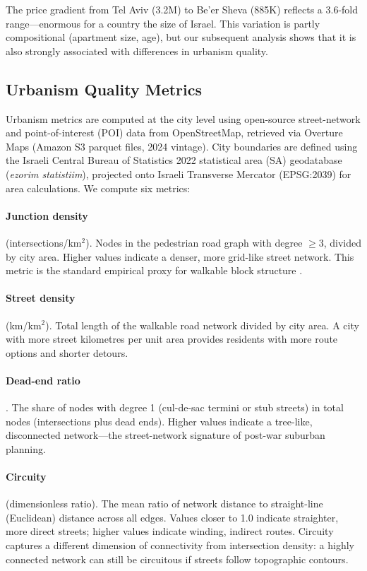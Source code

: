 \documentclass[12pt,a4paper]{article}
\begin{document}
The price gradient from Tel Aviv (\textsterling 3.2M) to Be'er Sheva
(\textsterling 885K) reflects a 3.6-fold range—enormous for a country the size
of Israel.  This variation is partly compositional (apartment size, age), but
our subsequent analysis shows that it is also strongly associated with
differences in urbanism quality.

\subsection{Urbanism Quality Metrics}
\label{sec:data_urbanism}

Urbanism metrics are computed at the city level using open-source street-network
and point-of-interest (POI) data from OpenStreetMap, retrieved via Overture Maps
(Amazon S3 parquet files, 2024 vintage).  City boundaries are defined using the
Israeli Central Bureau of Statistics 2022 statistical area (SA) geodatabase
(\textit{ezorim statistiim}), projected onto Israeli Transverse Mercator
(EPSG:2039) for area calculations.  We compute six metrics:

\paragraph{Junction density} (intersections/km$^2$).  Nodes in the pedestrian
road graph with degree $\geq 3$, divided by city area.  Higher values indicate
a denser, more grid-like street network.  This metric is the standard empirical
proxy for walkable block structure \citep{barrington2015}.

\paragraph{Street density} (km/km$^2$).  Total length of the walkable road
network divided by city area.  A city with more street kilometres per unit area
provides residents with more route options and shorter detours.

\paragraph{Dead-end ratio}.  The share of nodes with degree 1 (cul-de-sac
termini or stub streets) in total nodes (intersections plus dead ends).  Higher
values indicate a tree-like, disconnected network—the street-network signature
of post-war suburban planning.

\paragraph{Circuity} (dimensionless ratio).  The mean ratio of network distance
to straight-line (Euclidean) distance across all edges.  Values closer to 1.0
indicate straighter, more direct streets; higher values indicate winding,
indirect routes.  Circuity captures a different dimension of connectivity from
intersection density: a highly connected network can still be circuitous if
streets follow topographic contours.
\end{document}
